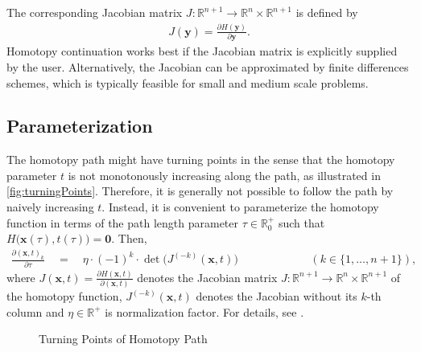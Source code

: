 \documentclass[11pt,fleqn]{article}
\newcommand{\R}{\mathbb{R}}
\begin{document}
The corresponding Jacobian matrix $J: \mathbb{R}^{n+1} \rightarrow \mathbb{R}^n \times \mathbb{R}^{n+1}$ is defined by
\begin{align*}
	J(\bm{y}) = \frac{\partial H(\bm{y})}{\partial \bm{y}}.
\end{align*}
Homotopy continuation works best if the Jacobian matrix is explicitly supplied by the user. Alternatively, the Jacobian can be approximated by finite differences schemes, which is typically feasible for small and medium scale problems.




\subsection{Parameterization}

The homotopy path might have turning points in the sense that the homotopy parameter $t$ is not monotonously increasing along the path, as illustrated in \autoref{fig:turningPoints}. Therefore, it is generally not possible to follow the path by naively increasing $t$. Instead, it is convenient to parameterize the homotopy function in terms of the path length parameter $\tau \in \R_0^+$ such that $H\bigl(\bm{x}(\tau),t(\tau)\bigr) = \bm{0}$. Then,
\begin{align*}
	\frac{\partial(\bm{x},t)_k}{\partial\tau} \quad=\quad \eta \cdot (-1)^k \cdot \det\bigl(J^{(-k)}(\bm{x},t)\bigr) &&& \qquad\qquad ( k \in \{1, \dots, n+1\} ),
\end{align*}
where $J(\bm{x},t) = \frac{\partial H(\bm{x},t)}{\partial (\bm{x},t)}$ denotes the Jacobian matrix $J:\R^{n+1} \rightarrow \R^n \times \R^{n+1}$ of the homotopy function, $J^{(-k)}(\bm{x},t)$ denotes the Jacobian without its $k$-th column and $\eta \in \R^+$ is normalization factor. For details, see \citet[pp.~25~ff.]{ZangwillGarcia1981}.

\begin{figure}[tbh]
\vspace{1em}
\caption{Turning Points of Homotopy Path}
\label{fig:turningPoints}
\begin{center}
\end{center}
\vspace{1em}
\end{figure}
\end{document}
